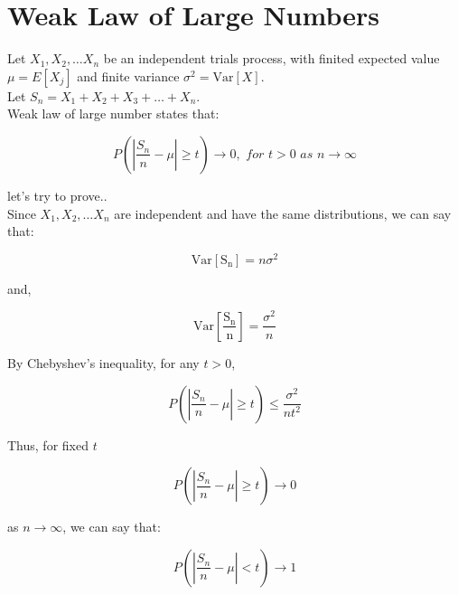 \documentclass[11pt]{article}
\begin{document}
\section{Weak Law of Large Numbers}

Let $X_1, X_2, \dots X_n$ be an independent trials process, with finited expected value $\mu = E[X_j]$ and finite variance $\sigma^{2} = \mathrm{Var}[X]$. \\

Let $S_n = X_1 + X_2 + X_3 + \dots + X_n$. \\

Weak law of large number states that:

\begin{equation}
P(|\frac{S_n}{n} - \mu| \geq t) \rightarrow 0 , \textit{ for } t > 0 \textit{ as } n \rightarrow \infty
\end{equation}

let's try to prove.. \\

Since $X_1, X_2, \dots X_n$ are independent and have the same distributions, we can say that: 

\begin{equation}
\mathrm{Var[S_n]} = n \sigma^2 
\end{equation}

and,

\begin{equation}
\mathrm{Var[\frac{S_n}{n}]} = \frac{\sigma^2}{n} 
\end{equation}

By Chebyshev's inequality, for any $t > 0$, 

\begin{equation}
 P(|\frac{S_n}{n} - \mu| \geq t) \leq \frac{\sigma^{2}}{nt^{2}} 
\end{equation}

Thus, for fixed $t$ 

\begin{equation}
P(|\frac{S_n}{n} - \mu| \geq t) \rightarrow 0 
\end{equation}

as $n \rightarrow \infty$, we can say that: 

\begin{equation}
 P(|\frac{S_n}{n} - \mu| < t) \rightarrow 1 
\end{equation}
\end{document}
